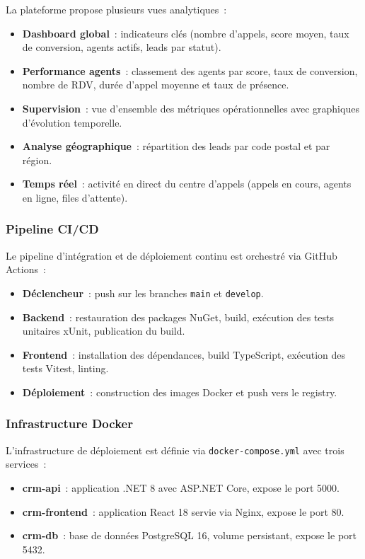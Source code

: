 La plateforme propose plusieurs vues analytiques~:

\begin{itemize}
    \item \textbf{Dashboard global}~: indicateurs clés (nombre d'appels, score moyen,
    taux de conversion, agents actifs, leads par statut).
    \item \textbf{Performance agents}~: classement des agents par score, taux de
    conversion, nombre de RDV, durée d'appel moyenne et taux de présence.
    \item \textbf{Supervision}~: vue d'ensemble des métriques opérationnelles avec
    graphiques d'évolution temporelle.
    \item \textbf{Analyse géographique}~: répartition des leads par code postal et
    par région.
    \item \textbf{Temps réel}~: activité en direct du centre d'appels (appels en
    cours, agents en ligne, files d'attente).
\end{itemize}

\subsubsection{Pipeline CI/CD}

Le pipeline d'intégration et de déploiement continu est orchestré via GitHub Actions~:

\begin{itemize}
    \item \textbf{Déclencheur}~: push sur les branches \texttt{main} et \texttt{develop}.
    \item \textbf{Backend}~: restauration des packages NuGet, build, exécution des tests
    unitaires xUnit, publication du build.
    \item \textbf{Frontend}~: installation des dépendances, build TypeScript, exécution
    des tests Vitest, linting.
    \item \textbf{Déploiement}~: construction des images Docker et push vers le registry.
\end{itemize}

\subsubsection{Infrastructure Docker}

L'infrastructure de déploiement est définie via \texttt{docker-compose.yml} avec trois
services~:

\begin{itemize}
    \item \textbf{crm-api}~: application .NET 8 avec ASP.NET Core, expose le port 5000.
    \item \textbf{crm-frontend}~: application React 18 servie via Nginx, expose le port 80.
    \item \textbf{crm-db}~: base de données PostgreSQL 16, volume persistant, expose
    le port 5432.
\end{itemize}

